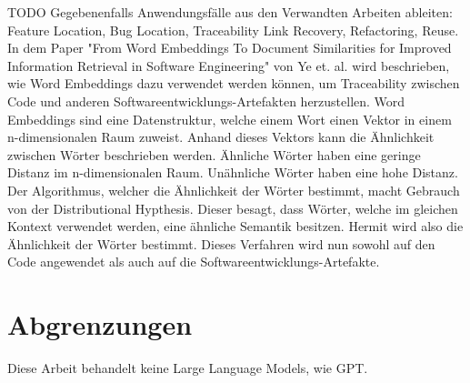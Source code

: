 TODO Gegebenenfalls Anwendungsfälle aus den Verwandten Arbeiten ableiten: Feature Location, Bug Location, Traceability Link Recovery, Refactoring, Reuse.\\

In dem Paper "From Word Embeddings To Document Similarities for Improved Information Retrieval in Software Engineering" von Ye et. al. wird beschrieben, wie Word Embeddings dazu verwendet werden können, um Traceability zwischen Code und anderen Softwareentwicklungs-Artefakten herzustellen.
Word Embeddings sind eine Datenstruktur, welche einem Wort einen Vektor in einem n-dimensionalen Raum zuweist.
Anhand dieses Vektors kann die Ähnlichkeit zwischen Wörter beschrieben werden.
Ähnliche Wörter haben eine geringe Distanz im n-dimensionalen Raum.
Unähnliche Wörter haben eine hohe Distanz.
Der Algorithmus, welcher die Ähnlichkeit der Wörter bestimmt, macht Gebrauch von der Distributional Hypthesis.
Dieser besagt, dass Wörter, welche im gleichen Kontext verwendet werden, eine ähnliche Semantik besitzen.
Hermit wird also die Ähnlichkeit der Wörter bestimmt.
Dieses Verfahren wird nun sowohl auf den Code angewendet als auch auf die Softwareentwicklungs-Artefakte.

\section{Abgrenzungen}
Diese Arbeit behandelt keine Large Language Models, wie GPT.